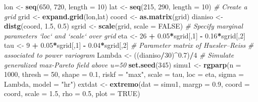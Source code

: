 \documentclass[]{book}
\newenvironment{Shaded}{\begin{snugshade}}{\end{snugshade}}
\newcommand{\CommentTok}[1]{\textcolor[rgb]{0.56,0.35,0.01}{\textit{#1}}}
\newcommand{\DataTypeTok}[1]{\textcolor[rgb]{0.13,0.29,0.53}{#1}}
\newcommand{\DecValTok}[1]{\textcolor[rgb]{0.00,0.00,0.81}{#1}}
\newcommand{\FloatTok}[1]{\textcolor[rgb]{0.00,0.00,0.81}{#1}}
\newcommand{\KeywordTok}[1]{\textcolor[rgb]{0.13,0.29,0.53}{\textbf{#1}}}
\newcommand{\NormalTok}[1]{#1}
\newcommand{\OperatorTok}[1]{\textcolor[rgb]{0.81,0.36,0.00}{\textbf{#1}}}
\newcommand{\OtherTok}[1]{\textcolor[rgb]{0.56,0.35,0.01}{#1}}
\newcommand{\StringTok}[1]{\textcolor[rgb]{0.31,0.60,0.02}{#1}}
\begin{document}
\begin{Shaded}
\begin{Highlighting}[]
\NormalTok{ lon <-}\StringTok{ }\KeywordTok{seq}\NormalTok{(}\DecValTok{650}\NormalTok{, }\DecValTok{720}\NormalTok{, }\DataTypeTok{length =} \DecValTok{10}\NormalTok{)}
\NormalTok{ lat <-}\StringTok{ }\KeywordTok{seq}\NormalTok{(}\DecValTok{215}\NormalTok{, }\DecValTok{290}\NormalTok{, }\DataTypeTok{length =} \DecValTok{10}\NormalTok{)}
 \CommentTok{# Create a grid}
\NormalTok{ grid <-}\StringTok{ }\KeywordTok{expand.grid}\NormalTok{(lon,lat)}
\NormalTok{ coord <-}\StringTok{ }\KeywordTok{as.matrix}\NormalTok{(grid)}
\NormalTok{ dianiso <-}\StringTok{ }\KeywordTok{distg}\NormalTok{(coord, }\FloatTok{1.5}\NormalTok{, }\FloatTok{0.5}\NormalTok{)}
\NormalTok{ sgrid <-}\StringTok{ }\KeywordTok{scale}\NormalTok{(grid, }\DataTypeTok{scale =} \OtherTok{FALSE}\NormalTok{)}
 \CommentTok{# Specify marginal parameters `loc` and `scale` over grid}
\NormalTok{ eta <-}\StringTok{ }\DecValTok{26} \OperatorTok{+}\StringTok{ }\FloatTok{0.05}\OperatorTok{*}\NormalTok{sgrid[,}\DecValTok{1}\NormalTok{] }\OperatorTok{-}\StringTok{ }\FloatTok{0.16}\OperatorTok{*}\NormalTok{sgrid[,}\DecValTok{2}\NormalTok{]}
\NormalTok{ tau <-}\StringTok{ }\DecValTok{9} \OperatorTok{+}\StringTok{ }\FloatTok{0.05}\OperatorTok{*}\NormalTok{sgrid[,}\DecValTok{1}\NormalTok{] }\OperatorTok{-}\StringTok{ }\FloatTok{0.04}\OperatorTok{*}\NormalTok{sgrid[,}\DecValTok{2}\NormalTok{]}
 \CommentTok{# Parameter matrix of Huesler--Reiss}
 \CommentTok{# associated to power variogram}
\NormalTok{ Lambda <-}\StringTok{ }\NormalTok{((dianiso}\OperatorTok{/}\DecValTok{30}\NormalTok{)}\OperatorTok{^}\FloatTok{0.7}\NormalTok{)}\OperatorTok{/}\DecValTok{4}
 \CommentTok{# Simulate generalized max-Pareto field above u=50}
 \KeywordTok{set.seed}\NormalTok{(}\DecValTok{345}\NormalTok{)}
\NormalTok{ simu1 <-}\StringTok{ }\KeywordTok{rgparp}\NormalTok{(}\DataTypeTok{n =} \DecValTok{1000}\NormalTok{, }\DataTypeTok{thresh =} \DecValTok{50}\NormalTok{, }\DataTypeTok{shape =} \FloatTok{0.1}\NormalTok{, }\DataTypeTok{riskf =} \StringTok{"max"}\NormalTok{,}
                 \DataTypeTok{scale =}\NormalTok{ tau, }\DataTypeTok{loc =}\NormalTok{ eta, }\DataTypeTok{sigma =}\NormalTok{ Lambda, }\DataTypeTok{model =} \StringTok{"hr"}\NormalTok{)}
\NormalTok{ extdat <-}\StringTok{ }\KeywordTok{extremo}\NormalTok{(}\DataTypeTok{dat =}\NormalTok{ simu1, }\DataTypeTok{margp =} \FloatTok{0.9}\NormalTok{, }\DataTypeTok{coord =}\NormalTok{ coord,}
                   \DataTypeTok{scale =} \FloatTok{1.5}\NormalTok{, }\DataTypeTok{rho =} \FloatTok{0.5}\NormalTok{, }\DataTypeTok{plot =} \OtherTok{TRUE}\NormalTok{)}
\end{Highlighting}
\end{Shaded}
\end{document}
